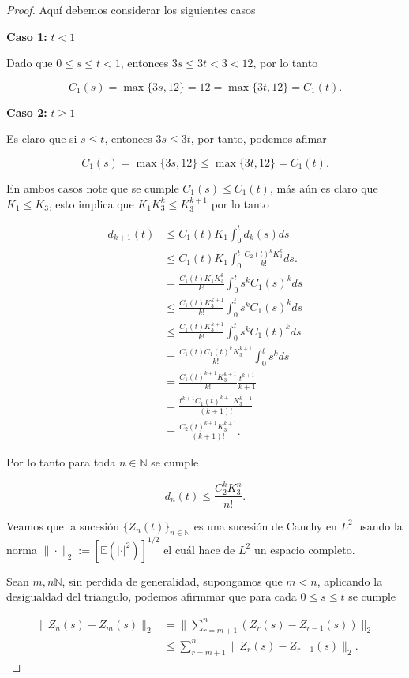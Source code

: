 \documentclass[
  spanish,
  us-letterpaper,
]{scrreprt}
\theoremstyle{plain}
\theoremstyle{plain}
\theoremstyle{plain}
\theoremstyle{definition}
\theoremstyle{remark}
\begin{document}
\begin{proof}
Aquí debemos considerar los siguientes casos

\textbf{Caso 1:} \(t<1\)

Dado que \(0\leq s\leq t<1\), entonces \(3s\leq 3t<3<12\), por lo tanto

\[
    C_1(s)=\max\{3s,12\}=12=\max\{3t,12\}=C_1(t).
\]

\textbf{Caso 2:} \(t\geq 1\)

Es claro que si \(s\leq t\), entonces \(3s\leq 3t\), por tanto, podemos
afimar

\[
    C_1(s)=\max\{3s,12\}\leq \max\{3t,12\}=C_1(t).
\]

En ambos casos note que se cumple \(C_1(s)\leq C_1(t)\), más aún es
claro que \(K_1\leq K_3\), esto implica que \(K_1K_3^k\leq K_3^{k+1}\)
por lo tanto

\[
    \begin{aligned}
        d_{k+1}(t) & \leq C_1(t)K_1\int_0^t d_k(s)ds\\ 
        & \leq C_1(t)K_1\int_0^t \frac{C_2(t)^k K_3^k}{k!}ds.\\ 
        & = \frac{C_1(t)K_1 K_3^k}{k!}\int_0^t s^kC_1(s)^k ds\\ 
        & \leq \frac{C_1(t)K_3^{k+1}}{k!}\int_0^t s^k C_1(s)^k ds\\
        & \leq \frac{C_1(t)K_3^{k+1}}{k!}\int_0^t s^k C_1(t)^k ds\\ 
        & = \frac{C_1(t)C_1(t)^k K_3^{k+1}}{k!}\int_0^t s^k ds\\ 
        & = \frac{C_1(t)^{k+1}K_3^{k+1}}{k!}\frac{t^{k+1}}{k+1}\\ 
        & = \frac{t^{k+1}C_1(t)^{k+1}K_3^{k+1}}{(k+1)!}\\ 
        & = \frac{C_2(t)^{k+1}K_3^{k+1}}{(k+1)!}.
    \end{aligned}
\]

Por lo tanto para toda \(n\in \mathbb{N}\) se cumple

\[
d_{n}(t)\leq \frac{C_2^k K_3^n}{n!}.
\]

Veamos que la sucesión \(\{Z_n(t)\}_{n\in \mathbb{N}}\) es una sucesión
de Cauchy en \(L^2\) usando la norma
\(\|\cdot\|_2:=[\mathbb{E}(|\cdot|^2)]^{1/2}\) el cuál hace de \(L^2\)
un espacio completo.

Sean \(m,n\mathbb{N}\), sin perdida de generalidad, supongamos que
\(m<n\), aplicando la desigualdad del triangulo, podemos afirmmar que
para cada \(0\leq s\leq t\) se cumple

\[
    \begin{aligned}
        \|Z_n(s)-Z_m(s)\|_2 & = \Bigg\|\sum\limits_{r=m+1}^n (Z_r(s)-Z_{r-1}(s))\Bigg\|_2\\ 
        & \leq \sum\limits_{r=m+1}^n\|Z_r(s)-Z_{r-1}(s)\|_2.
    \end{aligned}
\]


\end{proof}
\end{document}
